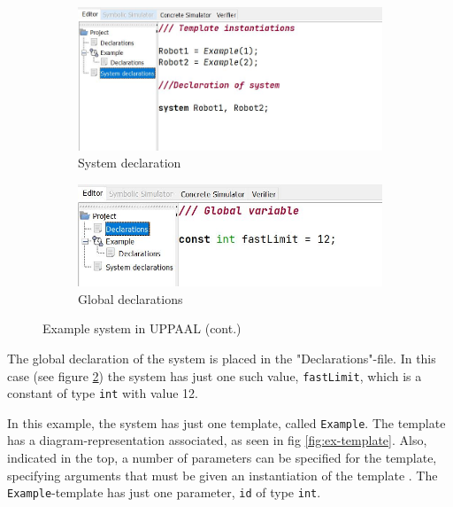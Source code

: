 \begin{figure}[ht]\ContinuedFloat
    \centering
    \begin{subfigure}{0.90\textwidth}
         \centering
    \includegraphics[width=\textwidth]{pictures/System_declaration_example.JPG}
    \caption{System declaration}
    \label{fig:ex-system-declaration}
    \end{subfigure}
     
    \medskip
     
    \begin{subfigure}{0.90\textwidth}
    \centering    \includegraphics[width=\textwidth]{pictures/global declarations_example.JPG}
    \caption{Global declarations}
    \label{fig:ex-global-declarations}
    \end{subfigure}
    
    \caption{Example system in UPPAAL (cont.)}
    \label{fig:ex-system}
\end{figure}

The global declaration of the system is placed in the "Declarations"-file. In this case (see figure \ref{fig:ex-global-declarations}) the system has just one such value, \verb|fastLimit|, which is a constant of type \verb|int| with value 12.

In this example, the system has just one template, called \verb|Example|. The template has a diagram-representation associated, as seen in fig \ref{fig:ex-template}. Also, indicated in the top, a number of parameters can be specified for the template, specifying arguments that must be given an instantiation of the template \parencite[p. 4]{UPPAALTutorial}. The \verb|Example|-template has just one parameter, \verb|id| of type \verb|int|.

